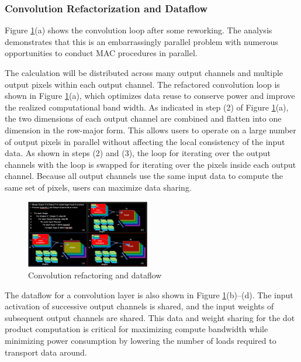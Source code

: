 \documentclass[letterpaper, 10 pt, conference]{ieeeconf}  %
\begin{document}
\subsubsection{Convolution Refactorization and Dataflow}
   

Figure \ref{refactoring_dataflow}(a) shows the convolution loop after some reworking. The analysis demonstrates that this is an embarrassingly parallel problem with numerous opportunities to conduct MAC procedures in parallel.

The calculation will be distributed across many output channels and multiple output pixels within each output channel. The refactored convolution loop is shown in Figure \ref{refactoring_dataflow}(a), which optimizes data reuse to conserve power and improve the realized computational band width. As indicated in step (2) of Figure \ref{refactoring_dataflow}(a), the two dimensions of each output channel are combined and flatten into one dimension in the row-major form. This allows users to operate on a large number of output pixels in parallel without affecting the local consistency of the input data. As shown in steps (2) and (3), the loop for iterating over the output channels with the loop is swapped for iterating over the pixels inside each output channel. Because all output channels use the same input data to compute the same set of pixels, users can maximize data sharing\cite{fsd_computer}.

\begin{figure}[hbt!]
\centering
\includegraphics[width=0.48\textwidth]{gfx/refactoring_dataflow.png}
\caption{Convolution refactoring and dataflow}
\label{refactoring_dataflow}
\end{figure}

The dataflow for a convolution layer is also shown in Figure \ref{refactoring_dataflow}(b)–(d). The input activation of successive output channels is shared, and the input weights of subsequent output channels are shared. This data and weight sharing for the dot product computation is critical for maximizing compute bandwidth while minimizing power consumption by lowering the number of loads required to transport data around\cite{fsd_computer}.
\end{document}

